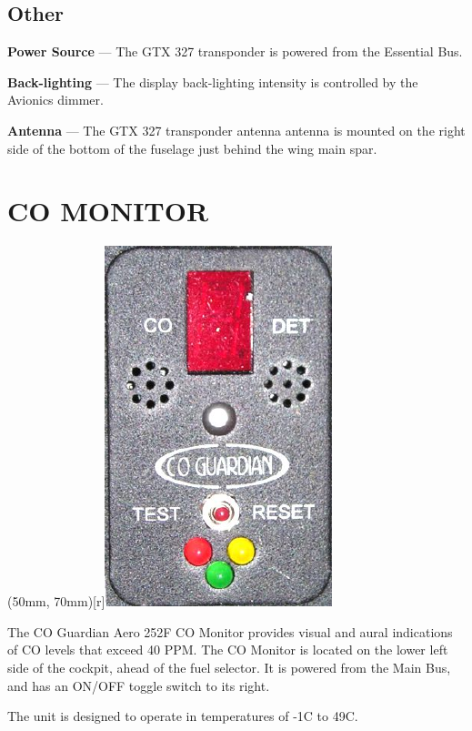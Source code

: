 \subsection*{Other}

\textbf{Power Source} --- The GTX 327 transponder is powered from the Essential Bus.

\textbf{Back-lighting} --- The display back-lighting intensity is controlled by the Avionics dimmer.

\textbf{Antenna} --- The GTX 327 transponder antenna antenna is mounted on the right side of the bottom of the fuselage just behind the wing main spar. 

\FloatBarrier 

%


\FloatBarrier

\section{CO MONITOR} 
\parpic(50mm, 70mm)[r]{\includegraphics{../Diagrams/co}}


The CO Guardian Aero 252F CO Monitor provides visual and aural indications of CO levels that exceed 40 PPM. The CO Monitor is located on the lower left side of the cockpit, ahead of the fuel selector. It is powered from the Main Bus, and has an ON/OFF toggle switch to its right.

The unit is designed to operate in temperatures of -1\textdegree C to 49\textdegree C.

